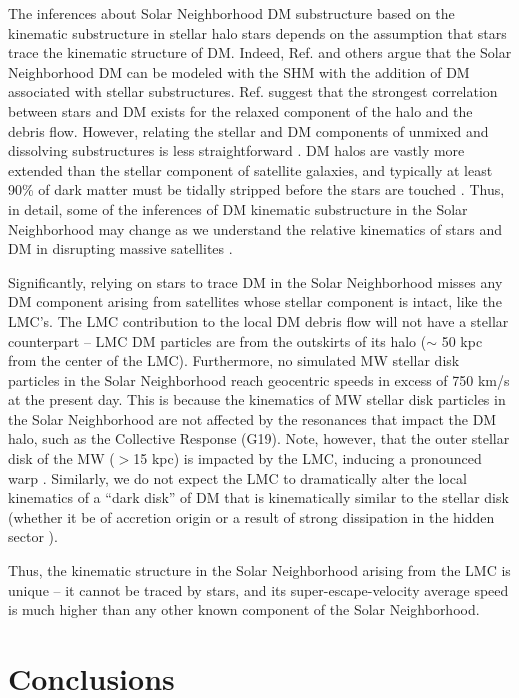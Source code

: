 \documentclass[letterpaper,11pt]{article}
\begin{document}
The inferences about Solar Neighborhood DM substructure based on the kinematic substructure in stellar halo stars depends on the assumption that stars trace the kinematic structure of DM.  Indeed, Ref. \cite{Evans:2019bqy} and others argue that the Solar Neighborhood DM can be modeled with the SHM with the addition of DM associated with stellar substructures.  Ref. \cite{Necib:2018igl} suggest that the strongest correlation between stars and DM exists for the relaxed component of the halo and the debris flow. However, relating the stellar and DM components of unmixed and dissolving substructures is less straightforward \cite{Bozorgnia2019}. DM halos are vastly more extended than the stellar component of satellite galaxies, and typically at least 90\% of dark matter must be tidally stripped before the stars are touched \cite{Penarrubia2008}.  Thus, in detail, some of the inferences of DM kinematic substructure in the Solar Neighborhood may change as we understand the relative kinematics of stars and DM in disrupting massive satellites \citep{Necib:2019iwb,Bozorgnia2019}. 

Significantly, relying on stars to trace DM in the Solar Neighborhood misses any DM component arising from satellites whose stellar component is intact, like the LMC's.  The LMC contribution to the local DM debris flow will not have a stellar counterpart -- 
LMC DM particles are from the outskirts of its halo ($\sim$ 50 kpc from the center of the LMC). 
Furthermore, no simulated MW stellar 
disk particles in the Solar Neighborhood reach geocentric speeds in excess of 750 km/s at the present day.
This is because the kinematics of MW stellar disk particles in the Solar Neighborhood are not affected by the resonances that impact the DM halo, such as the Collective Response (G19). Note, however, that the outer stellar disk of the MW ($>$15 kpc) is impacted by the LMC, inducing a pronounced warp \citep{Laporte:2018}. Similarly, we do not expect the LMC to dramatically alter the local kinematics of a ``dark disk'' of DM that is kinematically similar to the stellar disk (whether it be of accretion origin \cite{Read:2008fh} or a result of strong dissipation in the hidden sector \cite{Fan2013}).   


Thus, the kinematic structure in the Solar Neighborhood arising from the LMC is unique -- it cannot be traced by stars, and its super-escape-velocity average speed is much higher than any other known component of the Solar Neighborhood. 


\section{Conclusions}
\end{document}
